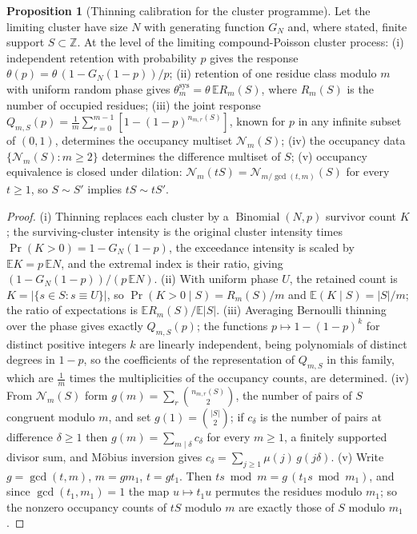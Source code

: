 \documentclass[11pt]{article}
\theoremstyle{definition}
\newcommand{\E}{\mathbb E}
\newcommand{\Z}{\mathbb Z}
\providecommand{\Z}{\mathbb Z}
\providecommand{\E}{\mathbb E}
\newtheorem{proposition}{Proposition}
\begin{document}
\begin{proposition}[Thinning calibration for the cluster programme]\label{ah:thin}
Let the limiting cluster have size $N$ with generating function $G_N$ and, where stated, finite support $S\subset\Z$.  At the level of the limiting compound-Poisson cluster process:
(i) independent retention with probability $p$ gives the response $\theta(p)=\theta\,(1-G_N(1-p))/p$;
(ii) retention of one residue class modulo $m$ with uniform random phase gives $\theta^{\mathrm{sys}}_m=\theta\,\E R_m(S)$, where $R_m(S)$ is the number of occupied residues;
(iii) the joint response $Q_{m,S}(p)=\tfrac1m\sum_{r=0}^{m-1}[1-(1-p)^{n_{m,r}(S)}]$, known for $p$ in any infinite subset of $(0,1)$, determines the occupancy multiset $\mathcal N_m(S)$;
(iv) the occupancy data $\{\mathcal N_m(S):m\ge2\}$ determines the difference multiset of $S$;
(v) occupancy equivalence is closed under dilation: $\mathcal N_m(tS)=\mathcal N_{m/\gcd(t,m)}(S)$ for every $t\ge1$, so $S\sim S'$ implies $tS\sim tS'$.
\end{proposition}

\begin{proof}
(i) Thinning replaces each cluster by a $\operatorname{Binomial}(N,p)$ survivor count $K$; the surviving-cluster intensity is the original cluster intensity times $\Pr(K>0)=1-G_N(1-p)$, the exceedance intensity is scaled by $\E K=p\,\E N$, and the extremal index is their ratio, giving $(1-G_N(1-p))/(p\,\E N)$.  (ii) With uniform phase $U$, the retained count is $K=|\{s\in S:s\equiv U\}|$, so $\Pr(K>0\mid S)=R_m(S)/m$ and $\E(K\mid S)=|S|/m$; the ratio of expectations is $\E R_m(S)/\E|S|$.  (iii) Averaging Bernoulli thinning over the phase gives exactly $Q_{m,S}(p)$; the functions $p\mapsto1-(1-p)^k$ for distinct positive integers $k$ are linearly independent, being polynomials of distinct degrees in $1-p$, so the coefficients of the representation of $Q_{m,S}$ in this family, which are $\tfrac1m$ times the multiplicities of the occupancy counts, are determined.  (iv) From $\mathcal N_m(S)$ form $g(m)=\sum_r\binom{n_{m,r}(S)}2$, the number of pairs of $S$ congruent modulo $m$, and set $g(1)=\binom{|S|}2$; if $c_\delta$ is the number of pairs at difference $\delta\ge1$ then $g(m)=\sum_{m\mid\delta}c_\delta$ for every $m\ge1$, a finitely supported divisor sum, and M\"obius inversion gives $c_\delta=\sum_{j\ge1}\mu(j)\,g(j\delta)$.  (v) Write $g=\gcd(t,m)$, $m=gm_1$, $t=gt_1$.  Then $ts\bmod m=g\,(t_1s\bmod m_1)$, and since $\gcd(t_1,m_1)=1$ the map $u\mapsto t_1u$ permutes the residues modulo $m_1$; so the nonzero occupancy counts of $tS$ modulo $m$ are exactly those of $S$ modulo $m_1$.
\end{proof}
\end{document}
